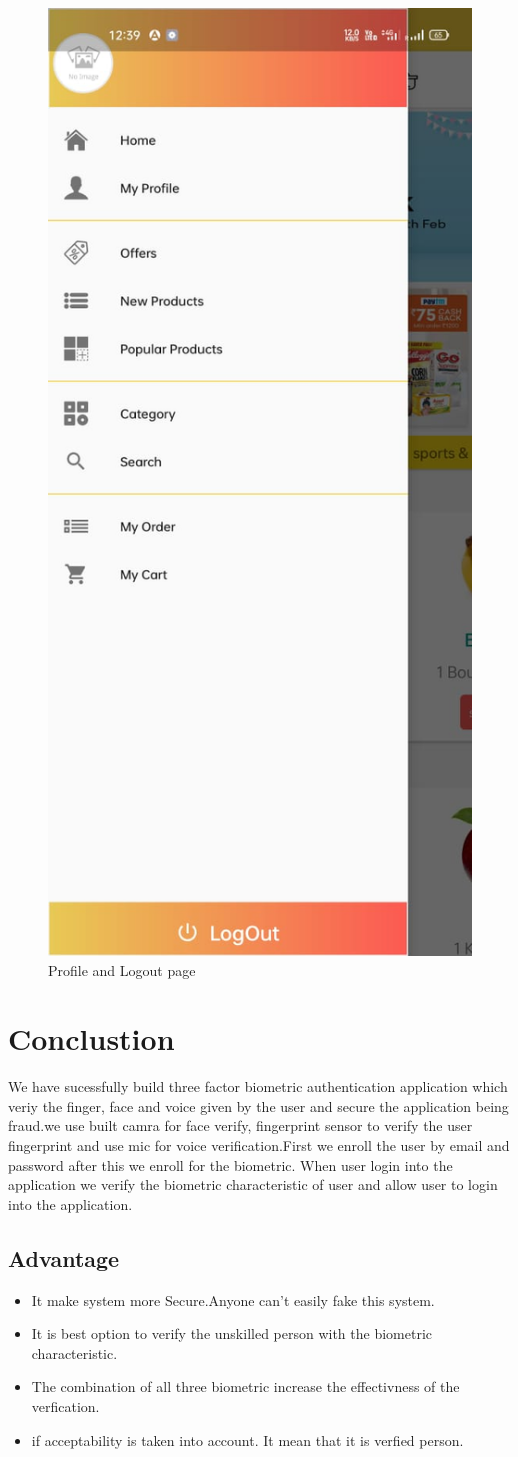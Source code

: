\documentclass[conference]{IEEEtran}
\begin{document}
\begin{figure}[htbp]
		
		\centerline{\includegraphics[width=0.4\columnwidth]{homepage2.jpeg}}
		\caption{Profile and Logout page }
		\label{fig}
\end{figure}


\afterpage{\clearpage}
\section{Conclustion}
We have sucessfully build three factor biometric authentication application which veriy the finger, face and voice given by the user and secure the application being fraud.we use built camra for face verify, fingerprint sensor to verify the user fingerprint and use mic for voice verification.First we enroll the user by email and password after this we enroll for the biometric. When user login into the application we verify the biometric characteristic of user and allow user to login into the application.
\subsection{Advantage}
\begin{itemize}
	\item It make system more Secure.Anyone can’t easily fake this system.
	\item It is best option to verify the unskilled person with the biometric characteristic.
	\item The combination of all three biometric increase the effectivness of the verfication.
	\item if acceptability is taken into account. It mean that it is verfied person.
\end{itemize}
\end{document}
